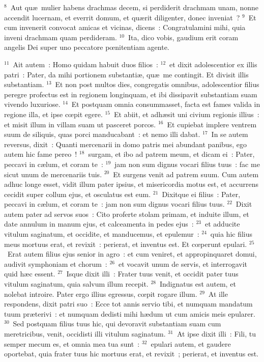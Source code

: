 ${}^{8}$~Aut qu\ae\ mulier habens drachmas decem, si perdiderit drachmam unam, nonne accendit lucernam, et everrit domum, et qu\ae rit diligenter, donec inveniat~?
${}^{9}$~Et cum invenerit convocat amicas et vicinas, dicens~: Congratulamini mihi, quia inveni drachmam quam perdideram.
${}^{10}$~Ita, dico vobis, gaudium erit coram angelis Dei super uno peccatore pœnitentiam agente.


${}^{11}$~Ait autem~: Homo quidam habuit duos filios~:
${}^{12}$~et dixit adolescentior ex illis patri~: Pater, da mihi portionem substanti\ae , qu\ae\ me contingit. Et divisit illis substantiam.
${}^{13}$~Et non post multos dies, congregatis omnibus, adolescentior filius peregre profectus est in regionem longinquam, et ibi dissipavit substantiam suam vivendo luxuriose.
${}^{14}$~Et postquam omnia consummasset, facta est fames valida in regione illa, et ipse cœpit egere.
${}^{15}$~Et abiit, et adh\ae sit uni civium regionis illius~: et misit illum in villam suam ut pasceret porcos.
${}^{16}$~Et cupiebat implere ventrem suum de siliquis, quas porci manducabant~: et nemo illi dabat.
${}^{17}$~In se autem reversus, dixit~: Quanti mercenarii in domo patris mei abundant panibus, ego autem hic fame pereo~!
${}^{18}$~surgam, et ibo ad patrem meum, et dicam ei~: Pater, peccavi in c\ae lum, et coram te~:
${}^{19}$~jam non sum dignus vocari filius tuus~: fac me sicut unum de mercenariis tuis.
${}^{20}$~Et surgens venit ad patrem suum. Cum autem adhuc longe esset, vidit illum pater ipsius, et misericordia motus est, et accurrens cecidit super collum ejus, et osculatus est eum.
${}^{21}$~Dixitque ei filius~: Pater, peccavi in c\ae lum, et coram te~: jam non sum dignus vocari filius tuus.
${}^{22}$~Dixit autem pater ad servos suos~: Cito proferte stolam primam, et induite illum, et date annulum in manum ejus, et calceamenta in pedes ejus~:
${}^{23}$~et adducite vitulum saginatum, et occidite, et manducemus, et epulemur~:
${}^{24}$~quia hic filius meus mortuus erat, et revixit~: perierat, et inventus est. Et cœperunt epulari.
${}^{25}$~Erat autem filius ejus senior in agro~: et cum veniret, et appropinquaret domui, audivit symphoniam et chorum~:
${}^{26}$~et vocavit unum de servis, et interrogavit quid h\ae c essent.
${}^{27}$~Isque dixit illi~: Frater tuus venit, et occidit pater tuus vitulum saginatum, quia salvum illum recepit.
${}^{28}$~Indignatus est autem, et nolebat introire. Pater ergo illius egressus, cœpit rogare illum.
${}^{29}$~At ille respondens, dixit patri suo~: Ecce tot annis servio tibi, et numquam mandatum tuum pr\ae terivi~: et numquam dedisti mihi h\ae dum ut cum amicis meis epularer.
${}^{30}$~Sed postquam filius tuus hic, qui devoravit substantiam suam cum meretricibus, venit, occidisti illi vitulum saginatum.
${}^{31}$~At ipse dixit illi~: Fili, tu semper mecum es, et omnia mea tua sunt~:
${}^{32}$~epulari autem, et gaudere oportebat, quia frater tuus hic mortuus erat, et revixit~; perierat, et inventus est.

